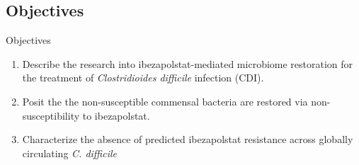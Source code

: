 

\subsection{Objectives}
\begin{frame}[plain]{Objectives}
        \begin{enumerate} %
                \item
                        Describe the research into ibezapolstat-mediated microbiome restoration for the treatment of \textit{Clostridioides difficile} infection (CDI). 
                 \item
                        Posit the the non-susceptible commensal bacteria are restored via non-susceptibility to ibezapolstat. 
                 \item
                        Characterize the absence of predicted ibezapolstat resistance across globally circulating \textit{C. difficile}
        \end{enumerate}
\end{frame}

